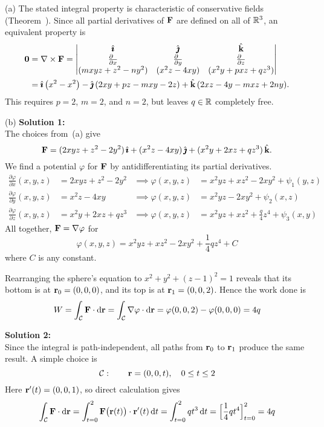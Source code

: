 \begin{solution} 
(a)
The stated integral property is characteristic of conservative fields (Theorem~).
Since all partial derivatives of $\mathbf{F}$ are defined on all of $\mathbb{R}^3$,
an equivalent property is
\begin{align*}
\vZero &= \nabla\times\vF
= \left|\begin{matrix} \hi & \hj & \hk \\ 
      \frac{\partial\hfill}{\partial x} & \frac{\partial\hfill}{\partial y} & \frac{\partial\hfill}{\partial z} \\
(mxyz + z^2 - ny^2) & (x^2 z - 4xy) & (x^2y + pxz + qz^3) \end{matrix}\right|
\\
&= \hi\,\big(x^2-x^2\big) - \hj\,(2xy+pz-mxy-2z) + \hk\,(2xz-4y-mxz+2ny).
\end{align*}
This requires $p=2$, $m=2$, and $n=2$, but leaves $q\in\mathbb{R}$ completely free.

(b) 
\textbf{Solution 1:}\\
The choices from~(a) give
$$
\mathbf{F} 
= (2xyz + z^2 - 2y^2)\,\hat{\pmb{\imath}} + (x^2 z - 4xy)\,\hat{\pmb{\jmath}} + (x^2y + 2xz + qz^3)\,\hat{\mathbf{k}}.
$$
We find a potential $\varphi$ for $\mathbf{F}$ by antidifferentiating its partial derivatives.
\begin{align*}
\frac{\partial \varphi}{\partial x}(x,y,z) &= 2xyz + z^2 - 2y^2 &\implies \varphi(x,y,z)&=x^2yz+xz^2-2xy^2+\psi_1(y,z)\\
\frac{\partial \varphi}{\partial y}(x,y,z) &= x^2 z - 4xy  &\implies \varphi(x,y,z)&=x^2yz-2xy^2+\psi_2(x,z)\\
\frac{\partial \varphi}{\partial z}(x,y,z) &= x^2y + 2xz + qz^3 &\implies \varphi(x,y,z)&=x^2yz+xz^2+\frac{q}{4}z^4+\psi_3(x,y)
\end{align*}
All together, $\mathbf{F}=\nabla\varphi$ for
$$
\varphi(x,y,z) = x^2 y z + x z^2 - 2 x y^2 + \frac{1}{4}q z^4 + C
$$
where $C$ is any constant.

Rearranging the sphere's equation to $x^2 + y^2 + (z-1)^2 = 1$
reveals that its bottom is at $\mathbf{r}_0 = (0,0,0)$, and its top is at 
$\mathbf{r}_1 = (0,0,2)$.
Hence the work done is
$$
W 
= \int_{\mathcal{C}} \mathbf{F}\cdot \mathrm{d}\mathbf{r}
= \int_{\mathcal{C}} \nabla\varphi\cdot \mathrm{d}\mathbf{r}
= \varphi(0,0,2) - \varphi(0,0,0)
= 4q
$$

\textbf{Solution 2:}\\
Since the integral is path-independent,
all paths from $\mathbf{r}_0$ to $\mathbf{r}_1$ produce
the same result.  A simple choice is
$$
\mathcal{C}:\qquad \mathbf{r} = (0,0,t),\quad 0\le t\le 2
$$
Here $\mathbf{r}'(t) = (0,0,1)$, so direct calculation gives
$$
\int_{\mathcal{C}} \mathbf{F}\cdot \mathrm{d}\mathbf{r}
= \int_{t=0}^2 \mathbf{F}\big(\mathbf{r}(t)\big)\cdot\mathbf{r}'(t)\,\mathrm{d}t
= \int_{t=0}^2 qt^3\,\mathrm{d}t
= \Big[\frac{1}{4}qt^4\Big]_{t=0}^2 = 4q
$$
\end{solution}



